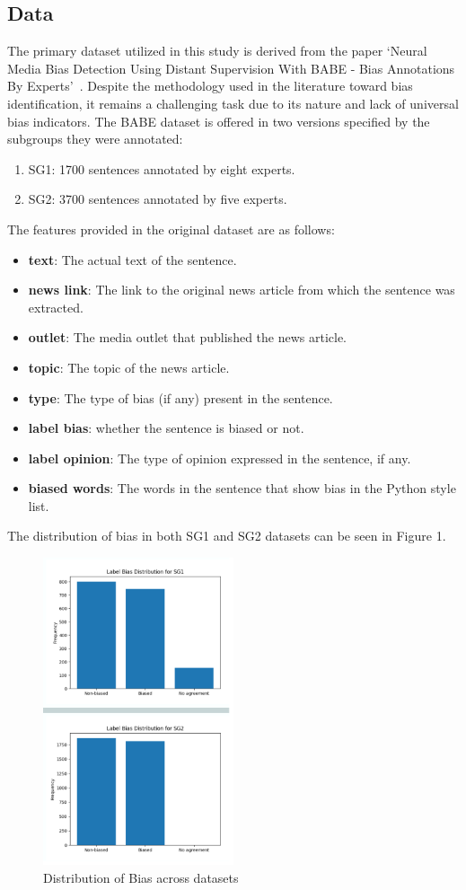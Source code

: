 \documentclass[11pt,a4paper]{article}
\begin{document}
\subsection{Data}
The primary dataset utilized in this study is derived from the paper ‘Neural Media Bias Detection Using Distant Supervision With BABE - Bias Annotations By Experts’~\cite{spinde_2021_neural}. Despite the methodology used in the literature toward bias identification, it remains a challenging task due to its nature and lack of universal bias indicators. The BABE dataset is offered in two versions specified by the subgroups they were annotated:
\begin{enumerate}
  \item SG1: 1700 sentences annotated by eight experts.
  \item SG2: 3700 sentences annotated by five experts.
\end{enumerate}
The features provided in the original dataset are as follows: 
\begin{itemize}
    \item \textbf{text}: The actual text of the sentence.
    \item \textbf{news link}: The link to the original news article from which the sentence was extracted.
    \item \textbf{outlet}: The media outlet that published the news article.
    \item \textbf{topic}: The topic of the news article.
    \item \textbf{type}: The type of bias (if any) present in the sentence.
    \item \textbf{label bias}: whether the sentence is biased or not.
    \item \textbf{label opinion}: The type of opinion expressed in the sentence, if any.
    \item \textbf{biased words}: The words in the sentence that show bias in the Python style list.    
\end{itemize}
The distribution of bias in both SG1 and SG2 datasets can be seen in Figure 1. 
\begin{figure}[t]
\centering
\includegraphics[width=0.5\textwidth]{SG_lb_bias.png}
\caption{Distribution of Bias across datasets}
\label{fig:my_label}
\end{figure}
\end{document}
